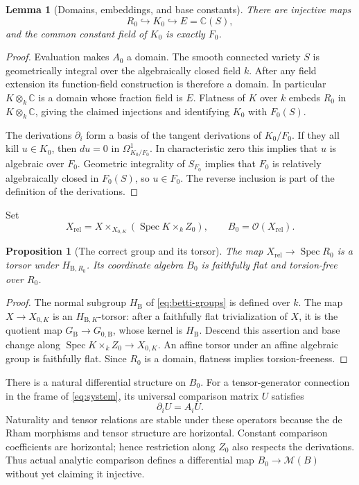 \documentclass[11pt]{article}
\numberwithin{equation}{section}
\newtheorem{lemma}[lemma]{Lemma}
\newtheorem{proposition}[proposition]{Proposition}
\theoremstyle{definition}
\theoremstyle{remark}
\newcommand{\C}{\mathbb C}
\newcommand{\Ocal}{\mathcal O}
\newcommand{\Spec}{\operatorname{Spec}}
\newcommand{\B}{\mathrm B}
\begin{document}
\begin{lemma}[Domains, embeddings, and base constants]\label{lem:base-field}
There are injective maps
\[
 R_0\hookrightarrow K_0\hookrightarrow E=\C(S),
\]
and the common constant field of $K_0$ is exactly $F_0$.
\end{lemma}
\begin{proof}
Evaluation makes $A_0$ a domain. The smooth connected variety $S$ is
geometrically integral over the algebraically closed field $k$. After any
field extension its function-field construction is therefore a domain.
In particular $K\otimes_k\C$ is a domain whose fraction field is $E$.
Flatness of $K$ over $k$ embeds $R_0$ in $K\otimes_k\C$, giving the
claimed injections and identifying $K_0$ with $F_0(S)$.

The derivations $\partial_i$ form a basis of the tangent derivations of
$K_0/F_0$. If they all kill $u\in K_0$, then $du=0$ in
$\Omega^1_{K_0/F_0}$. In characteristic zero this implies that $u$ is
algebraic over $F_0$. Geometric integrality of $S_{F_0}$ implies that
$F_0$ is relatively algebraically closed in $F_0(S)$, so $u\in F_0$.
The reverse inclusion is part of the definition of the derivations.
\end{proof}

Set
\begin{equation}\label{eq:relative-scheme}
 X_{\mathrm{rel}}=X\times_{X_{0,K}}(\Spec K\times_k Z_0),
 \qquad B_0=\Ocal(X_{\mathrm{rel}}).
\end{equation}

\begin{proposition}[The correct group and its torsor]\label{prop:relative-torsor}
The map $X_{\mathrm{rel}}\to\Spec R_0$ is a torsor under
$H_{\B,R_0}$. Its coordinate algebra $B_0$ is faithfully flat and
torsion-free over $R_0$.
\end{proposition}
\begin{proof}
The normal subgroup $H_\B$ of \eqref{eq:betti-groups} is defined over
$k$. The map $X\to X_{0,K}$ is an $H_{\B,K}$-torsor: after a faithfully
flat trivialization of $X$, it is the quotient map $G_\B\to G_{0,\B}$,
whose kernel is $H_\B$. Descend this assertion and base change along
$\Spec K\times_k Z_0\to X_{0,K}$. An affine torsor under an affine
algebraic group is faithfully flat. Since $R_0$ is a domain, flatness
implies torsion-freeness.
\end{proof}

There is a natural differential structure on $B_0$. For a tensor-generator
connection in the frame of \eqref{eq:system}, its universal comparison
matrix $U$ satisfies
\begin{equation}\label{eq:universal-derivation}
 \partial_iU=A_iU.
\end{equation}
Naturality and tensor relations are stable under these operators because
the de Rham morphisms and tensor structure are horizontal. Constant
comparison coefficients are horizontal; hence restriction along $Z_0$
also respects the derivations. Thus actual analytic comparison defines a
differential map $B_0\to\mathscr M(B)$ without yet claiming it injective.
\end{document}
